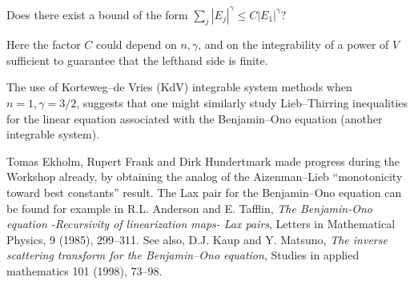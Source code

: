\documentclass[12pt,letterpaper, reqno]{amsart}
\begin{document}
\begin{problemblock}

\begin{problem}
  Does there exist a bound of the
form $\sum_j |E_j|^\gamma \leq C |E_1|^\gamma$? 
\end{problem}

 Here the factor $C$
could depend on $n,\gamma$, and on the integrability of a power of
$V$ sufficient to guarantee that the lefthand side is finite.

\end{problemblock}

\begin{problemblock}


\begin{problem}
  The use of Korteweg--de Vries
(KdV) integrable system methods when $n=1, \gamma=3/2$, suggests
that one might similarly study Lieb--Thirring inequalities for the
linear equation associated with the Benjamin--Ono equation (another
integrable system).
\end{problem}

Tomas Ekholm, Rupert Frank and Dirk Hundertmark
made progress during the Workshop already, by obtaining the analog
of the Aizenman--Lieb ``monotonicity toward best constants'' result.
The Lax pair for the Benjamin--Ono equation can be found for example
in R.L. Anderson and E. Tafflin, \emph{The Benjamin-Ono equation
-Recursivity of linearization maps- Lax pairs},
Letters in Mathematical Physics, 9 (1985), 299--311. See also,
D.J. Kaup and Y. Matsuno, \emph{The inverse scattering transform
for the Benjamin--Ono equation},
Studies in applied mathematics 101 (1998), 73--98.

\end{problemblock}
\end{document}
